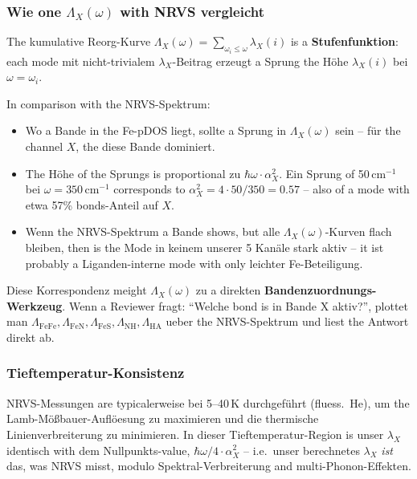 \documentclass[11pt,a4paper,twoside]{article}
\theoremstyle{remark}
\begin{document}
\subsubsection*{Wie one $\Lambda_X(\omega)$ with NRVS vergleicht}

The kumulative Reorg-Kurve $\Lambda_X(\omega) = \sum_{\omega_i \leq
\omega} \lambda_X(i)$ is a \textbf{Stufenfunktion}: each mode mit
nicht-trivialem $\lambda_X$-Beitrag erzeugt a Sprung the H\"ohe
$\lambda_X(i)$ bei $\omega = \omega_i$.

In comparison with the NRVS-Spektrum:
\begin{itemize}\setlength{\itemsep}{0pt}
  \item Wo a Bande in the Fe-pDOS liegt, sollte a Sprung in
        $\Lambda_X(\omega)$ sein -- f\"ur the channel $X$, the diese
        Bande dominiert.
  \item The H\"ohe of the Sprungs is proportional zu $\hbar\omega \cdot
        \alpha_X^2$. Ein Sprung of 50\,cm$^{-1}$ bei
        $\omega = 350$\,cm$^{-1}$ corresponds to $\alpha_X^2 = 4 \cdot 50/350
        = 0.57$ -- also of a mode with etwa 57\% bonds-Anteil
        auf $X$.
  \item Wenn the NRVS-Spektrum a Bande shows, but alle
        $\Lambda_X(\omega)$-Kurven flach bleiben, then is the Mode
        in keinem unserer 5 Kan\"ale stark aktiv -- it ist
        probably a Liganden-interne mode with only leichter
        Fe-Beteiligung.
\end{itemize}

Diese Korrespondenz meight $\Lambda_X(\omega)$ zu a direkten
\textbf{Bandenzuordnungs-Werkzeug}. Wenn a Reviewer fragt:
"`Welche bond is in Bande X aktiv?"', plottet man
$\Lambda_\text{FeFe}, \Lambda_\text{FeN}, \Lambda_\text{FeS},
\Lambda_\text{NH}, \Lambda_\text{HA}$ ueber the NRVS-Spektrum und
liest the Antwort direkt ab.

\subsubsection*{Tieftemperatur-Konsistenz}

NRVS-Messungen are typicalerweise bei 5--40\,K durchgef\"uhrt
(fluess.\ He), um the Lamb-M\"o{\ss}bauer-Auflöesung zu maximieren und
die thermische Linienverbreiterung zu minimieren. In dieser
Tieftemperatur-Region is unser $\lambda_X$ identisch with dem
Nullpunkts-value, $\hbar\omega/4 \cdot \alpha_X^2$ -- i.e.\ unser
berechnetes $\lambda_X$ \emph{ist} das, was NRVS misst, modulo
Spektral-Verbreiterung and multi-Phonon-Effekten.
\end{document}
